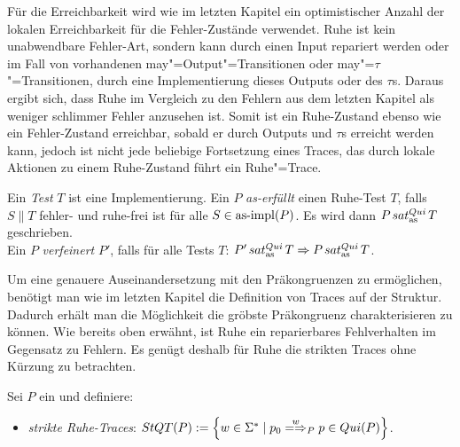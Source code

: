 Für die Erreichbarkeit wird wie im letzten Kapitel ein optimistischer Anzahl
der lokalen Erreichbarkeit für die Fehler-Zustände verwendet. Ruhe ist kein
unabwendbare \glqq Fehler-Art\grqq{}, sondern kann durch einen Input repariert
werden oder im Fall von vorhandenen may"=Output"=Transitionen oder
may"=$\tau$"=Transitionen, durch eine Implementierung dieses Outputs oder des
$\tau$s. Daraus ergibt sich, dass Ruhe im Vergleich zu den Fehlern aus dem
letzten Kapitel als weniger \glqq schlimmer Fehler\grqq{} anzusehen ist. Somit
ist ein Ruhe-Zustand ebenso wie ein Fehler-Zustand erreichbar, sobald er durch
Outputs und $\tau$s erreicht werden kann, jedoch ist nicht jede beliebige
Fortsetzung eines Traces, das durch lokale Aktionen zu einem Ruhe-Zustand führt
ein Ruhe"=Trace.

\begin{Def}
  \label{RuheTestDef}
  Ein \emph{Test} $T$ ist eine Implementierung. Ein \MEIO{} $P$
  \emph{as-erfüllt} einen Ruhe-Test $T$, falls $S\|T$ fehler- und ruhe-frei ist
  für alle $S\in \mathrm{as}\text{-}\mathrm{impl} (P)$. Es wird dann $P \hspace{0.05cm}sat_\mathrm{as}^{Qui}\hspace{0.05cm} T$ geschrieben.\\
  Ein \MEIO{} $P$ \emph{verfeinert} $P'$, falls für alle Tests $T$: $P'\hspace{0.05cm}sat_\mathrm{as}^{Qui}\hspace{0.05cm}
  T \Rightarrow P\hspace{0.05cm}sat_\mathrm{as}^{Qui}\hspace{0.05cm} T$.
\end{Def}

Um eine genauere Auseinandersetzung mit den Präkongruenzen zu ermöglichen,
benötigt man wie im letzten Kapitel die Definition von Traces auf der Struktur.
Dadurch erhält man die Möglichkeit die gröbste Präkongruenz charakterisieren zu
können. Wie bereits oben erwähnt, ist Ruhe ein reparierbares \glqq
Fehlverhalten\grqq{} im Gegensatz zu Fehlern. Es genügt deshalb für Ruhe die
strikten Traces ohne Kürzung zu betrachten.

\begin{Def}
  \label{RuheTraceDef}
  Sei $P$ ein \MEIO{} und definiere:
  \begin{itemize}
    \item \emph{strikte Ruhe-Traces}: $\StQT (P) := \left\{w\in\Sigma ^*\mid
      p_0 \weakmay[w]_P p\in Qui(P)\right\}$.
  \end{itemize}
\end{Def}

\vspace{0.2cm}

